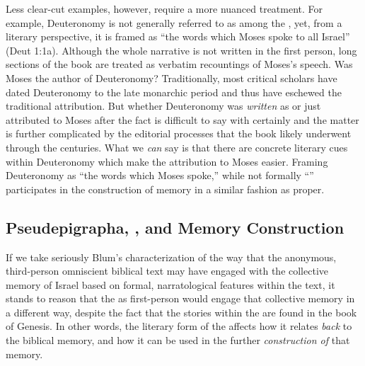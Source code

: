 Less clear-cut examples, however, require a more nuanced treatment. For example, Deuteronomy is not generally referred to as among the \psa, yet, from a literary perspective, it is framed as  ``the words which Moses spoke to all Israel'' (Deut 1:1a). Although the whole narrative is not written in the first person, long sections of the book are treated as verbatim recountings of Moses's speech. Was Moses the author of Deuteronomy? Traditionally, most critical scholars have dated Deuteronomy to the late monarchic period and thus have eschewed the traditional attribution. But whether Deuteronomy was \emph{written} as \psa or just attributed to Moses after the fact is difficult to say with certainly and the matter is further complicated by the editorial processes that the book likely underwent through the centuries.\autocite[143--172]{toorn2007} What we \emph{can} say is that there are concrete literary cues within Deuteronomy which make the attribution to Moses easier. Framing Deuteronomy as ``the words which Moses spoke,'' while not formally ``\psa'' participates in the construction of memory in a similar fashion as \psa proper.

\subsection{Pseudepigrapha, \ga, and Memory Construction}

If we take seriously Blum's characterization of the way that the anonymous, third-person omniscient biblical text may have engaged with the collective memory of Israel based on formal, narratological features within the text, it stands to reason that the \ga as first-person \psy would engage that collective memory in a different way, despite the fact that the stories within the \ga are found in the book of Genesis. In other words, the literary form of the \ga affects how it relates \emph{back} to the biblical memory, and how it can be used in the further \emph{construction of} that memory.

